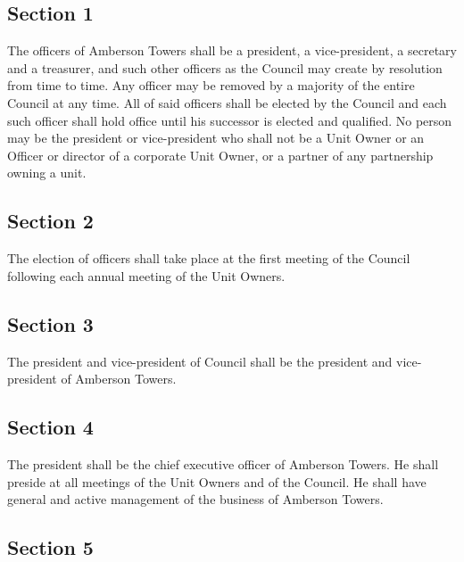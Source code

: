 \documentclass[
]{book}
\begin{document}
\hypertarget{section-1-5}{%
\subsection*{Section 1}\label{section-1-5}}

The officers of Amberson Towers shall be a president, a vice-president, a secretary and a treasurer, and such other officers as the Council may create by resolution from time to time. Any officer may be removed by a majority of the entire Council at any time. All of said officers shall be elected by the Council and each such officer shall hold office until his successor is elected and qualified. No person may be the president or vice-president who shall not be a Unit Owner or an Officer or director of a corporate Unit Owner, or a partner of any partnership owning a unit.

\hypertarget{section-2-5}{%
\subsection*{Section 2}\label{section-2-5}}

The election of officers shall take place at the first meeting of the Council following each annual meeting of the Unit Owners.

\hypertarget{section-3-2}{%
\subsection*{Section 3}\label{section-3-2}}

The president and vice-president of Council shall be the president and vice-president of Amberson Towers.

\hypertarget{section-4-2}{%
\subsection*{Section 4}\label{section-4-2}}

The president shall be the chief executive officer of Amberson Towers. He shall preside at all meetings of the Unit Owners and of the Council. He shall have general and active management of the business of Amberson Towers.

\hypertarget{section-5-2}{%
\subsection*{Section 5}\label{section-5-2}}
\end{document}
